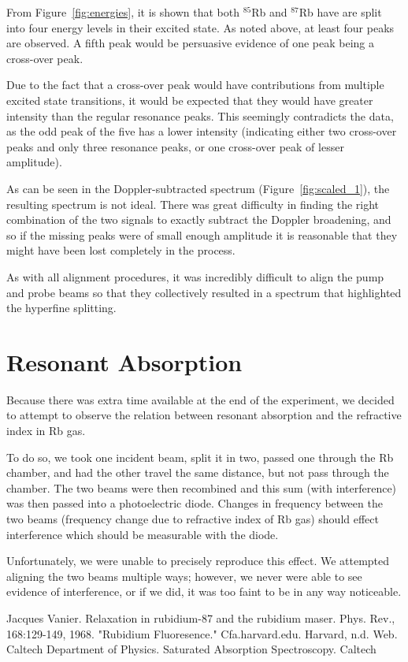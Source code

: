 \documentclass[paper=a4, fontsize=11pt]{scrartcl} %
\numberwithin{equation}{section}
\numberwithin{figure}{section}
\numberwithin{table}{section}
\begin{document}
From Figure~\ref{fig:energies}, it is shown that both $^{85}$Rb and $^{87}$Rb have are split into four energy levels in their excited state. As noted above, at least four peaks are observed. A fifth peak would be persuasive evidence of one peak being a cross-over peak.

Due to the fact that a cross-over peak would have contributions from multiple excited state transitions, it would be expected that they would have greater intensity than the regular resonance peaks. This seemingly contradicts the data, as the odd peak of the five has a lower intensity (indicating either two cross-over peaks and only three resonance peaks, or one cross-over peak of lesser amplitude).

As can be seen in the Doppler-subtracted spectrum
(Figure~\ref{fig:scaled_1}), the resulting spectrum is not ideal. There was great difficulty in finding the right combination of the two
signals to exactly subtract the Doppler broadening, and so if the
missing peaks were of small enough amplitude it is reasonable that
they might have been lost completely in the process.

As with all alignment procedures, it was incredibly difficult to align the pump and probe beams so that they collectively resulted in a spectrum that highlighted the hyperfine splitting.


\section{Resonant Absorption}
\label{sec:resab}


Because there was extra time available at the end of the experiment, we decided to attempt to observe the relation between resonant absorption and the refractive index in Rb gas.

To do so, we took one incident beam, split it in two, passed one through the Rb chamber, and had the other travel the same distance, but not pass through the chamber. The two beams were then recombined and this sum (with interference) was then passed into a photoelectric diode. Changes in frequency between the two beams (frequency change due to refractive index of Rb gas) should effect interference which should be measurable with the diode.

Unfortunately, we were unable to precisely reproduce this effect. We attempted aligning the two beams multiple ways; however, we never were able to see evidence of interference, or if we did, it was too faint to be in any way noticeable.

\clearpage
\begin{thebibliography}{99}
Jacques Vanier. Relaxation in rubidium-87 and the
  rubidium maser. Phys. Rev., 168:129-149, 1968.
"Rubidium Fluoresence." Cfa.harvard.edu. Harvard,
  n.d. Web.
Caltech Department of Physics. Saturated Absorption
Spectroscopy. Caltech
\end{thebibliography}


\end{document}
